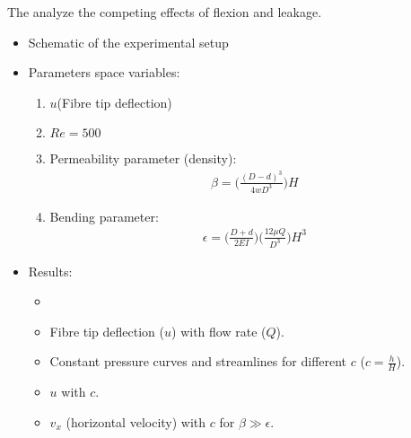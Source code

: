 \documentclass[preprint, letterpaper, nobibnotes, aps, superscriptaddress,prb]{revtex4-1}
\begin{document}
The analyze the competing effects of flexion and leakage.
\begin{itemize}
\item
Schematic of the experimental setup
\begin{figure}[H]
  \centering {}
  \caption{}\label{fig1}
\end{figure}
  \begin{figure}[H]
  \centering {}
  \caption{}\label{fig2}
\end{figure}
\item
Parameters space variables: 
\begin{enumerate}
\item
$u$(Fibre tip deflection)
\item 
$Re = 500$
\item 
Permeability parameter (density):
\begin{align*}
\beta=\Bigg(\frac{(D-d)^3}{4wD^3}\Bigg)H
\end{align*}
\item 
Bending parameter:
\begin{align*}
\epsilon=\Big(\frac{D+d}{2EI}\Big)\Big(\frac{12\mu Q}{D^3}\Big)H^3
\end{align*}
\end{enumerate}

\item
Results: 
\begin{itemize}
	\item
	
	\item Fibre tip deflection ($u$) with flow rate ($Q$).
  \begin{figure}[H]
  \centering {}
  \caption{}\label{fig3}
\end{figure}

	\item Constant pressure curves and streamlines for different $c$ ($c=\frac{h}{H}$).
  \begin{figure}[H]
  \centering {}
  \caption{}\label{fig4}
\end{figure}

  \item $u$ with $c$.
  \begin{figure}[H]
  \centering {}
  \caption{}\label{fig7}
\end{figure}


  \item $v_x$ (horizontal velocity) with $c$ for $\beta \gg \epsilon$.
  \begin{figure}[H]
  \centering {}
  \caption{}\label{fig6}
\end{figure}


\end{itemize}
\end{itemize}
\end{document}
